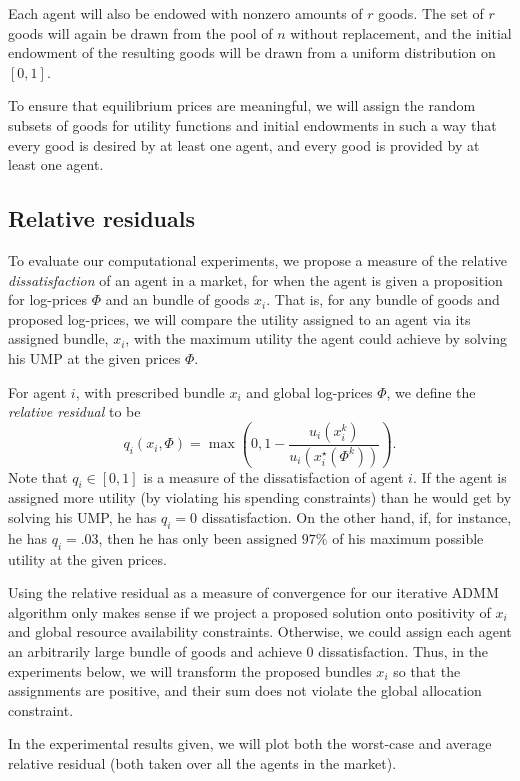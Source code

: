 \documentclass[12pt]{article}
\begin{document}
Each agent will also be endowed with nonzero amounts of $r$ goods. The set of
$r$ goods will again be drawn from the pool of $n$ without replacement, and the
initial endowment of the resulting goods will be drawn from a uniform
distribution on $[0,1]$.

To ensure that equilibrium prices are meaningful, we will assign the random
subsets of goods for utility functions and initial endowments in such a way
that every good is desired by at least one agent, and every good is provided by
at least one agent.

\subsection{Relative residuals}

To evaluate our computational experiments, we propose a measure of the relative
\emph{dissatisfaction} of an agent in a market, for when the agent is given a
proposition for log-prices $\Phi$ and an bundle of goods $x_i$. That is, for
any bundle of goods and proposed log-prices, we will compare the utility
assigned to an agent via its assigned bundle, $x_i$, with the maximum utility
the agent could achieve by solving his UMP at the given prices $\Phi$.

For agent $i$, with prescribed bundle $x_i$ and global log-prices $\Phi$,
we define the \emph{relative residual} to be
\[
q_i(x_i, \Phi)= \max\left(0,1-\frac{u_i(x_i^k)}{u_i(x_i^\star(\Phi^k))}\right).
\]
Note that $q_i \in [0,1]$ is a measure of the dissatisfaction of agent $i$. If
the agent is assigned more utility (by violating his spending constraints) than
he would get by solving his UMP, he has $q_i = 0$ dissatisfaction. On the other
hand, if, for instance, he has $q_i = .03$, then he has only been assigned
$97\%$ of his maximum possible utility at the given prices.

Using the relative residual as a measure of convergence for our iterative ADMM
algorithm only makes sense if we project a proposed solution onto positivity of
$x_i$ and global resource availability constraints. Otherwise, we could assign
each agent an arbitrarily large bundle of goods and achieve 0 dissatisfaction.
Thus, in the experiments below, we will transform the proposed bundles $x_i$ so
that the assignments are positive, and their sum does not violate the global
allocation constraint.

In the experimental results given, we will plot both the worst-case and average
relative residual (both taken over all the agents in the market).
\end{document}
